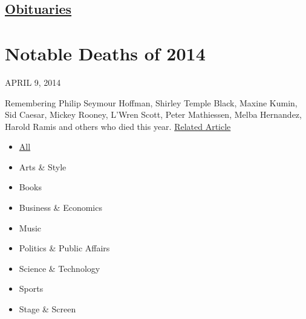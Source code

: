 \hypertarget{-obituaries-}{%
\subsection{\texorpdfstring{
\href{https://www.nytimes.com/section/obituaries}{Obituaries}
}{ Obituaries }}\label{-obituaries-}}

\hypertarget{notable-deaths-of-2014}{%
\section{Notable Deaths of 2014}\label{notable-deaths-of-2014}}

APRIL 9, 2014

Remembering Philip Seymour Hoffman, Shirley Temple Black, Maxine Kumin,
Sid Caesar, Mickey Rooney, L'Wren Scott, Peter Mathiessen, Melba
Hernandez, Harold Ramis and others who died this year.
\href{https://www.nytimes.com/interactive/2015/obituaries/notable-deaths-2015.html}{Related
Article}

\begin{itemize}
\tightlist
\item
  \href{/}{All}
\end{itemize}

\begin{itemize}
\tightlist
\item
  Arts \& Style
\item
  Books
\item
  Business \& Economics
\item
  Music
\item
  Politics \& Public Affairs
\item
  Science \& Technology
\item
  Sports
\item
  Stage \& Screen
\end{itemize}

\subsection{}


